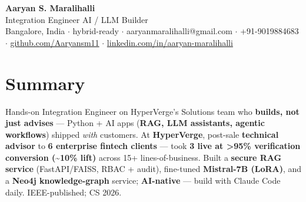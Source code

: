 \documentclass[10pt,a4paper]{article}
\begin{document}
\vspace*{-1cm}
\begin{center}
{\LARGE\bfseries Aaryan S. Maralihalli}\\[0.5em]
{\large Integration Engineer  \textbar{}  AI / LLM Builder}\\[0.3em]
Bangalore, India $\cdot$ hybrid-ready $\cdot$ aaryanmaralihalli@gmail.com $\cdot$ +91-9019884683 $\cdot$ \href{https://github.com/Aaryansm11}{github.com/Aaryansm11} $\cdot$ \href{https://linkedin.com/in/aaryan-maralihalli}{linkedin.com/in/aaryan-maralihalli}
\end{center}\vspace{0.4ex}
\section*{Summary}
Hands-on Integration Engineer on HyperVerge's Solutions team who \textbf{builds, not just advises} --- Python + AI apps (\textbf{RAG, LLM assistants, agentic workflows}) shipped \textit{with} customers. At \textbf{HyperVerge}, post-sale \textbf{technical advisor} to \textbf{6 enterprise fintech clients} --- took \textbf{3 live at \textgreater{}95\% verification conversion (\textasciitilde{}10\% lift)} across 15+ lines-of-business. Built a \textbf{secure RAG service} (FastAPI/FAISS, RBAC + audit), fine-tuned \textbf{Mistral-7B (LoRA)}, and a \textbf{Neo4j knowledge-graph} service; \textbf{AI-native} --- build with Claude Code daily. IEEE-published; CS 2026.\par\vspace{2pt}
\end{document}
